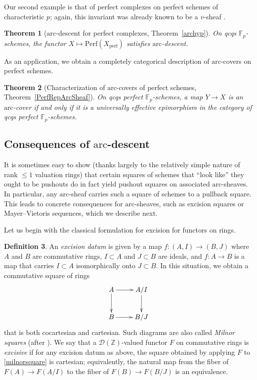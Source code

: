 \documentclass[reqno]{amsart}
\newcommand{\arc}{\mathrm{arc}}
\newcommand{\D}{\mathcal{D}}
\newtheorem{theorem}{Theorem}[section]
\theoremstyle{definition}
\newtheorem{definition}[theorem]{Definition}
\begin{document}
Our second example is that of perfect complexes on perfect schemes of
characteristic $p$; again, this invariant was already known to be a $v$-sheaf
\cite[Sec.~11]{BhattScholzeWitt}.


\begin{theorem}[$\arc$-descent for perfect complexes, Theorem~\ref{archyp}] 
On qcqs $\mathbb{F}_p$-schemes, the functor $X \mapsto \mathrm{Perf}( X_{\mathrm{perf}})$
satisfies $\arc$-descent. 
\end{theorem} 


As an application, we obtain a completely categorical description of $\arc$-covers on perfect schemes.


\begin{theorem}[Characterization of $\arc$-covers of perfect schemes, Theorem~\ref{PerfRepArcSheaf}] 
On qcqs perfect $\mathbb{F}_p$-schemes, a map $Y \to X$ is an $\arc$-cover if
and only if it is a universally effective epimorphism \cite[Tag
00WP]{stacks-project} in the category of qcqs perfect $\mathbb{F}_p$-schemes. 
\end{theorem} 



\subsection{Consequences of $\arc$-descent}
\label{ss:ConseqArcDesct}

It is sometimes easy to show (thanks largely to the relatively simple nature of
rank $\leq 1$ valuation rings) that certain squares of schemes that ``look
like'' they ought to be pushouts do in fact yield pushout squares on associated
$\arc$-sheaves. In particular, any $\arc$-sheaf carries such a square of
schemes to a pullback square. This leads to concrete consequences for
$\arc$-sheaves, such as excision squares or Mayer--Vietoris sequences, which we describe next.


Let us begin with the classical formulation for excision for functors on rings. 





\begin{definition}
\label{excdatum}
An {\em excision datum} is given by a map $f\colon (A,I) \to (B,J)$ where $A$ and $B$ are commutative rings, $I \subset A$ and $J \subset B$ are ideals, and $f\colon A \to B$ is a map that carries $I \subset A$ isomorphically onto $J \subset B$. In this situation, we obtain a commutative square 
of rings
\begin{equation} \label{milnorsquare} \xymatrix{ A \ar[r] \ar[d] & A/I \ar[d] \\
		   B \ar[r] & B/J } \end{equation}
that is both cocartesian and cartesian.  Such diagrams are also called \emph{Milnor
squares} (after \cite[\S 2]{Milnor}).  We say that a $\D(\mathbb{Z})$-valued
functor $F$ on commutative rings is \emph{excisive} if for any excision datum as above,
the square obtained by applying $F$ to \eqref{milnorsquare} is  cartesian;
equivalently, the natural map from the fiber of $F(A) \to F(A/I)$ to the fiber of $F(B) \to F(B/J)$ is an equivalence.
\end{definition}
\end{document}
